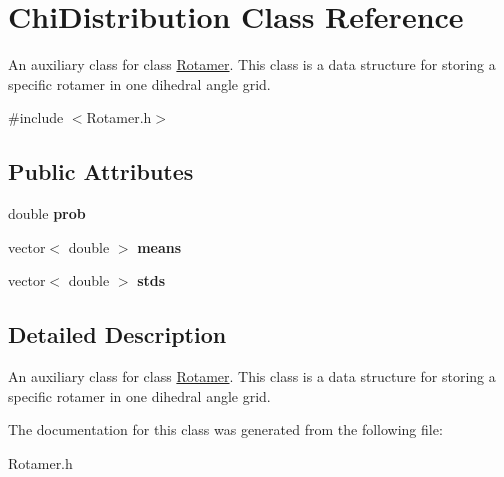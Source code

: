 \hypertarget{classChiDistribution}{\section{Chi\-Distribution Class Reference}
\label{classChiDistribution}
}


An auxiliary class for class \hyperlink{classRotamer}{Rotamer}. This class is a data structure for storing a specific rotamer in one dihedral angle grid.  




{\ttfamily \#include $<$Rotamer.\-h$>$}

\subsection*{Public Attributes}
\begin{DoxyCompactItemize}
\item 
\hypertarget{classChiDistribution_a7cc9d2f21e285cf918a4829fc8e21de0}{double {\bfseries prob}}\label{classChiDistribution_a7cc9d2f21e285cf918a4829fc8e21de0}

\item 
\hypertarget{classChiDistribution_a98b76c68b35b348fc71aad85ef3c8acb}{vector$<$ double $>$ {\bfseries means}}\label{classChiDistribution_a98b76c68b35b348fc71aad85ef3c8acb}

\item 
\hypertarget{classChiDistribution_a1f14a38d2b9d88426d935229a4df34b8}{vector$<$ double $>$ {\bfseries stds}}\label{classChiDistribution_a1f14a38d2b9d88426d935229a4df34b8}

\end{DoxyCompactItemize}


\subsection{Detailed Description}
An auxiliary class for class \hyperlink{classRotamer}{Rotamer}. This class is a data structure for storing a specific rotamer in one dihedral angle grid. 

The documentation for this class was generated from the following file\-:\begin{DoxyCompactItemize}
\item 
Rotamer.\-h\end{DoxyCompactItemize}
